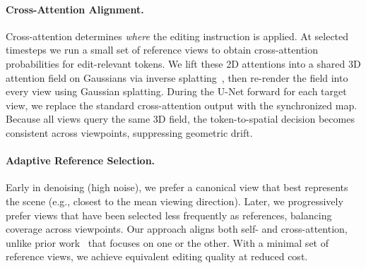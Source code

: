 \paragraph{Cross-Attention Alignment.}
Cross-attention determines \emph{where} the editing instruction is applied. At selected timesteps we run a small set of reference views to obtain cross-attention probabilities for edit-relevant tokens. We lift these 2D attentions into a shared 3D attention field on Gaussians via inverse splatting~\cite{chen_gaussianeditor_2024}, then re-render the field into every view using Gaussian splatting. During the U-Net forward for each target view, we replace the standard cross-attention output with the synchronized map. Because all views query the same 3D field, the token-to-spatial decision becomes consistent across viewpoints, suppressing geometric drift.

\paragraph{Adaptive Reference Selection.}
Early in denoising (high noise), we prefer a canonical view that best represents the scene (e.g., closest to the mean viewing direction). Later, we progressively prefer views that have been selected less frequently as references, balancing coverage across viewpoints. Our approach aligns both self- and cross-attention, unlike prior work~\cite{geyer_tokenflow_, chen2024dge, wang2025vcedit} that focuses on one or the other. With a minimal set of reference views, we achieve equivalent editing quality at reduced cost.

